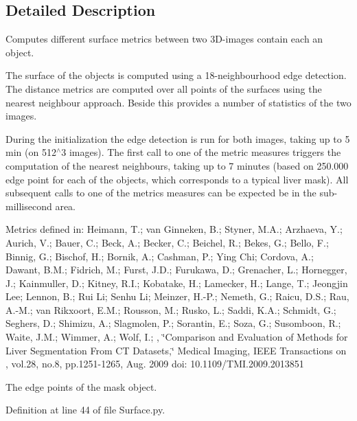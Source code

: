 \subsection{Detailed Description}
Computes different surface metrics between two 3D-\/images contain each an object. 

The surface of the objects is computed using a 18-\/neighbourhood edge detection. The distance metrics are computed over all points of the surfaces using the nearest neighbour approach. Beside this provides a number of statistics of the two images.

During the initialization the edge detection is run for both images, taking up to 5 min (on 512$^\wedge$3 images). The first call to one of the metric measures triggers the computation of the nearest neighbours, taking up to 7 minutes (based on 250.000 edge point for each of the objects, which corresponds to a typical liver mask). All subsequent calls to one of the metrics measures can be expected be in the sub-\/millisecond area.

Metrics defined in: Heimann, T.; van Ginneken, B.; Styner, M.A.; Arzhaeva, Y.; Aurich, V.; Bauer, C.; Beck, A.; Becker, C.; Beichel, R.; Bekes, G.; Bello, F.; Binnig, G.; Bischof, H.; Bornik, A.; Cashman, P.; Ying Chi; Cordova, A.; Dawant, B.M.; Fidrich, M.; Furst, J.D.; Furukawa, D.; Grenacher, L.; Hornegger, J.; Kainmuller, D.; Kitney, R.I.; Kobatake, H.; Lamecker, H.; Lange, T.; Jeongjin Lee; Lennon, B.; Rui Li; Senhu Li; Meinzer, H.-\/P.; Nemeth, G.; Raicu, D.S.; Rau, A.-\/M.; van Rikxoort, E.M.; Rousson, M.; Rusko, L.; Saddi, K.A.; Schmidt, G.; Seghers, D.; Shimizu, A.; Slagmolen, P.; Sorantin, E.; Soza, G.; Susomboon, R.; Waite, J.M.; Wimmer, A.; Wolf, I.; , \char`\"{}Comparison and Evaluation of Methods for Liver Segmentation From CT Datasets,\char`\"{} Medical Imaging, IEEE Transactions on , vol.28, no.8, pp.1251-\/1265, Aug. 2009 doi: 10.1109/TMI.2009.2013851 \begin{DoxyVerb}The edge points of the mask object.\end{DoxyVerb}
 

Definition at line 44 of file Surface.py.



